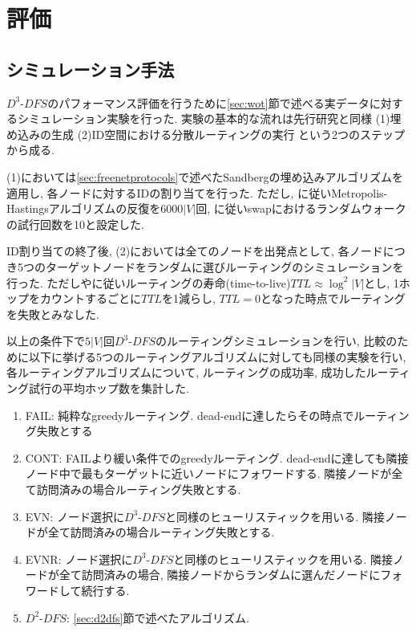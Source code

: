 \documentclass[dvipdfmx]{ampbt}
\begin{document}
 \section{評価}
  \subsection{シミュレーション手法}
  $D^3$-$DFS$のパフォーマンス評価を行うために\ref{sec:wot}節で述べる実データに対するシミュレーション実験を行った. 実験の基本的な流れは先行研究と同様 (1)埋め込みの生成 (2)ID空間における分散ルーティングの実行 という2つのステップから成る.

  (1)においては\ref{sec:freenetprotocols}で述べたSandbergの埋め込みアルゴリズムを適用し, 各ノードに対するIDの割り当てを行った. ただし, \cite{sandberg2006distributed}に従いMetropolis-Hastingsアルゴリズムの反復を$6000|V|$回, \cite{roos2016analyzing}に従い\gls{swap}におけるランダムウォークの試行回数を10と設定した.

  ID割り当ての終了後, (2)においては全てのノードを出発点として, 各ノードにつき5つのターゲットノードをランダムに選びルーティングのシミュレーションを行った. ただし\cite{sandberg2006distributed}や\cite{schiller2011attack}に従いルーティングの寿命(time-to-live)$TTL\approx \log^2|V|$とし, 1ホップをカウントするごとに$TTL$を1減らし, $TTL=0$となった時点でルーティングを失敗とみなした.

  以上の条件下で$5|V|$回$D^3$-$DFS$のルーティングシミュレーションを行い, 比較のために以下に挙げる5つのルーティングアルゴリズムに対しても同様の実験を行い, 各ルーティングアルゴリズムについて, ルーティングの成功率, 成功したルーティング試行の平均ホップ数を集計した.

   \begin{enumerate}[label=(\alph*)]
    \item FAIL: 純粋なgreedyルーティング. dead-endに達したらその時点でルーティング失敗とする\cite{sandberg2006distributed}
    \item CONT: FAILより緩い条件でのgreedyルーティング. dead-endに達しても隣接ノード中で最もターゲットに近いノードにフォワードする. 隣接ノードが全て訪問済みの場合ルーティング失敗とする. \cite{sandberg2006distributed}
    \item EVN: ノード選択に$D^3$-$DFS$と同様のヒューリスティックを用いる. 隣接ノードが全て訪問済みの場合ルーティング失敗とする. 
    \item EVNR: ノード選択に$D^3$-$DFS$と同様のヒューリスティックを用いる. 隣接ノードが全て訪問済みの場合, 隣接ノードからランダムに選んだノードにフォワードして続行する. \cite{simsek2008navigating}
    \item $D^2$-$DFS$: \ref{sec:d2dfs}節で述べたアルゴリズム.
   \end{enumerate}
\end{document}

